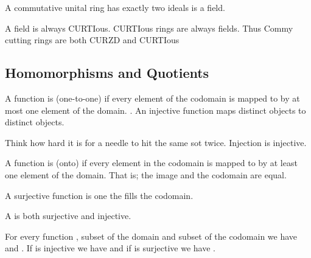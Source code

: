\begin{Le} A commutative unital ring  has exactly two ideals \e{$\Longleftrightarrow $}  is a field. \end{Le}
\begin{R} A field is always CURTIous. CURTIous rings are always fields. Thus Commy cutting rings are both CURZD and CURTIous \end{R}








\subsection{Homomorphisms and Quotients}
\begin{D} A function  is  (one-to-one) if every element of the codomain is mapped to by at most one element of the domain. . An injective function maps distinct objects to distinct objects.
\end{D}
\begin{R} Think how hard it is for a needle to hit the same sot twice. Injection is injective.  \end{R}

\begin{D} A function is  (onto) if every element in the codomain is mapped to by at least one element of the domain. That is; the image and the codomain are equal.  \end{D}
\begin{R} A surjective function is one the fills the codomain.  \end{R}
\begin{D} A  is both surjective and injective. \end{D}
\begin{T} For every function , subset  of the domain and subset  of the codomain we have  and . If  is injective we have  and if  is surjective we have .
\end{T}

